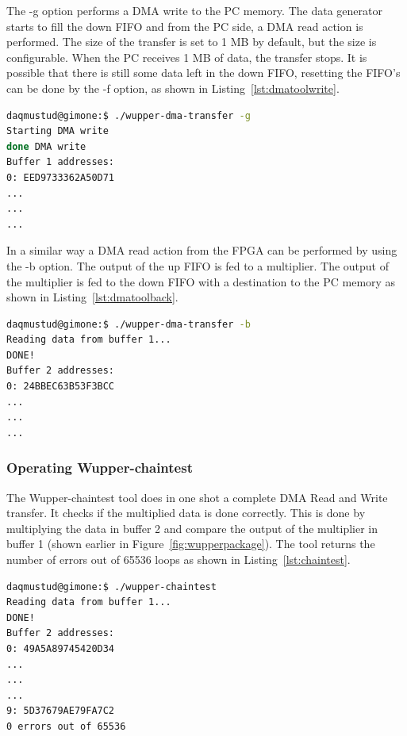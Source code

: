 The -g option performs a DMA write to the PC memory. The data generator starts to fill the down FIFO and from the PC side, a DMA read action is performed. The size of the transfer is set to 1 MB by default, but the size is configurable. When the PC receives 1 MB of data, the transfer stops. It is possible that there is still some data left in the down FIFO, resetting the FIFO's can be done by the -f option, as shown in Listing~\ref{lst:dmatoolwrite}.

\begin{lstlisting}[language=BASH, frame=single, label={lst:dmatoolwrite}, caption=Start generating data to the target.]
daqmustud@gimone:$ ./wupper-dma-transfer -g
Starting DMA write
done DMA write 
Buffer 1 addresses:
0: EED9733362A50D71 
...
...
...
\end{lstlisting}

\newpage

In a similar way a DMA read action from the FPGA can be performed by using the -b option. The output of the up FIFO is fed to a multiplier. The output of the multiplier is fed to the down FIFO with a destination to the PC memory as shown in Listing~\ref{lst:dmatoolback}.

\begin{lstlisting}[language=BASH, frame=single, label={lst:dmatoolback}, caption= Performing a DMA read and DMA write]
daqmustud@gimone:$ ./wupper-dma-transfer -b
Reading data from buffer 1...
DONE!
Buffer 2 addresses:
0: 24BBEC63B53F3BCC 
...
...
...
\end{lstlisting}

\subsubsection{Operating Wupper-chaintest}
The Wupper-chaintest tool does in one shot a complete DMA Read and Write transfer. It checks if the multiplied data is done correctly. This is done by multiplying the data in buffer 2 and compare the output of the multiplier in buffer 1 (shown earlier in Figure~\ref{fig:wupperpackage}). The tool returns the number of errors out of 65536 loops as shown in Listing~\ref{lst:chaintest}.
\begin{lstlisting}[language=BASH, frame=single, label={lst:chaintest}, caption=Output of Wupper-chaintest]
daqmustud@gimone:$ ./wupper-chaintest      
Reading data from buffer 1...
DONE!
Buffer 2 addresses:
0: 49A5A89745420D34 
...
...
... 
9: 5D37679AE79FA7C2 
0 errors out of 65536
\end{lstlisting}

